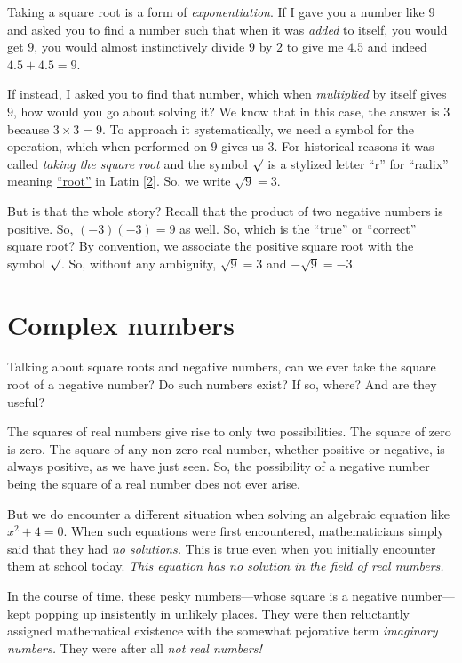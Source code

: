 \documentclass[
  a4paper,
]{article}
\begin{document}
Taking a square root is a form of \emph{exponentiation}. If I gave you a
number like \(9\) and asked you to find a number such that when it was
\emph{added} to itself, you would get \(9\), you would almost
instinctively divide \(9\) by \(2\) to give me \(4.5\) and indeed
\(4.5 + 4.5 = 9\).

If instead, I asked you to find that number, which when
\emph{multiplied} by itself gives \(9\), how would you go about solving
it? We know that in this case, the answer is \(3\) because
\(3 \times 3 = 9\). To approach it systematically, we need a symbol for
the operation, which when performed on \(9\) gives us \(3\). For
historical reasons it was called \emph{taking the square root} and the
symbol \(\surd\) is a stylized letter ``r'' for ``radix'' meaning
\href{https://math.stackexchange.com/questions/809799/why-the-name-square-root}{``root''}
in Latin {[}\protect\hyperlink{ref-squareroot}{2}{]}. So, we write
\(\sqrt{9} = 3\).

But is that the whole story? Recall that the product of two negative
numbers is positive. So, \((-3)(-3) = 9\) as well. So, which is the
``true'' or ``correct'' square root? By convention, we associate the
positive square root with the symbol \(\surd\). So, without any
ambiguity, \(\sqrt{9} = 3\) and \(-\sqrt{9} = -3\).

\hypertarget{complex-numbers}{%
\section{Complex numbers}\label{complex-numbers}}

Talking about square roots and negative numbers, can we ever take the
square root of a negative number? Do such numbers exist? If so, where?
And are they useful?

The squares of real numbers give rise to only two possibilities. The
square of zero is zero. The square of any non-zero real number, whether
positive or negative, is always positive, as we have just seen. So, the
possibility of a negative number being the square of a real number does
not ever arise.

But we do encounter a different situation when solving an algebraic
equation like \(x^{2} + 4 = 0\). When such equations were first
encountered, mathematicians simply said that they had \emph{no
solutions.} This is true even when you initially encounter them at
school today. \emph{This equation has no solution in the field of real
numbers.}

In the course of time, these pesky numbers---whose square is a negative
number---kept popping up insistently in unlikely places. They were then
reluctantly assigned mathematical existence with the somewhat pejorative
term \emph{imaginary numbers.} They were after all \emph{not real
numbers!}
\end{document}
